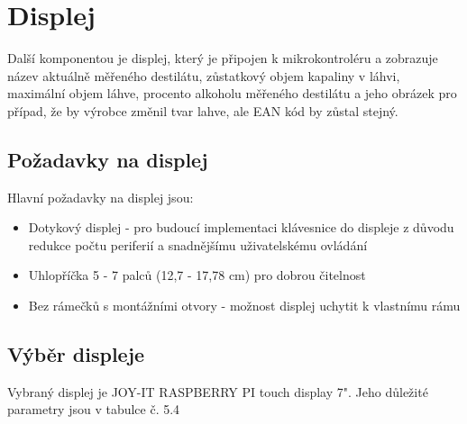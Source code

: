 






\section{Displej}
Další komponentou je displej, který je připojen k mikrokontroléru a zobrazuje název aktuálně měřeného destilátu, zůstatkový objem kapaliny v láhvi, maximální objem láhve, procento alkoholu měřeného destilátu a jeho obrázek pro případ, že by výrobce změnil tvar lahve, ale EAN kód by zůstal stejný.

\subsection{Požadavky na displej}
Hlavní požadavky na displej jsou:
\begin{itemize}
    \item Dotykový displej - pro budoucí implementaci klávesnice do displeje z důvodu redukce počtu periferií a snadnějšímu uživatelskému ovládání
    \item Uhlopříčka 5 - 7 palců (12,7 - 17,78 cm) pro dobrou čitelnost
    \item Bez rámečků s montážními otvory - možnost displej uchytit k vlastnímu rámu 
\end{itemize}

\subsection{Výběr displeje}

Vybraný displej je JOY-IT RASPBERRY PI touch display 7". Jeho důležité parametry jsou v tabulce č. 5.4\\

